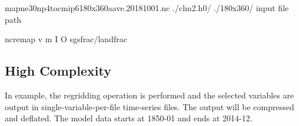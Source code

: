 \documentclass[letterpaper,10pt,english]{sphinxmanual}
\begin{document}
\begin{sphinxVerbatim}[commandchars=\\\{\}]
map\PYGZus{}ne30np4\PYGZus{}to\PYGZus{}cmip6\PYGZus{}180x360\PYGZus{}aave.20181001.nc
./clm2.h0/
./180x360/
               
\PYGZlt{}input file path\PYGZgt{}         

ncremap \PYGZhy{}v  \PYGZhy{}m  \PYGZhy{}I  \PYGZhy{}O  \PYGZhy{}\PYGZhy{}sgs\PYGZus{}frac/landfrac
\end{sphinxVerbatim}


\subsection{High Complexity}
\label{\detokenize{lnd_regrid:high-complexity}}
In example, the regridding operation is performed and the selected variables are output in single-variable-per-file time-series files.
The output will be compressed and deflated. The model data starts at 1850-01 and ends at 2014-12.
\end{document}
